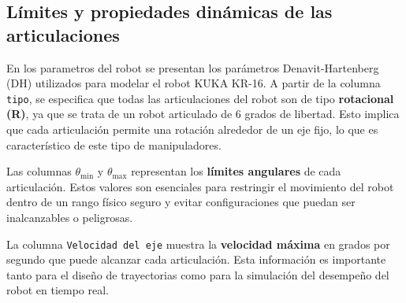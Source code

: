 \subsection{Límites y propiedades dinámicas de las articulaciones} \label{subsec:limites_propiedades}

En los parametros del robot se presentan los parámetros Denavit-Hartenberg (DH) utilizados para modelar el robot KUKA KR-16. A partir de la columna \texttt{tipo}, se especifica que todas las articulaciones del robot son de tipo \textbf{rotacional (R)}, ya que se trata de un robot articulado de 6 grados de libertad. Esto implica que cada articulación permite una rotación alrededor de un eje fijo, lo que es característico de este tipo de manipuladores.

Las columnas $\theta_{\text{min}}$ y $\theta_{\text{max}}$ representan los \textbf{límites angulares} de cada articulación. Estos valores son esenciales para restringir el movimiento del robot dentro de un rango físico seguro y evitar configuraciones que puedan ser inalcanzables o peligrosas.

La columna \texttt{Velocidad del eje} muestra la \textbf{velocidad máxima} en grados por segundo que puede alcanzar cada articulación. Esta información es importante tanto para el diseño de trayectorias como para la simulación del desempeño del robot en tiempo real.

